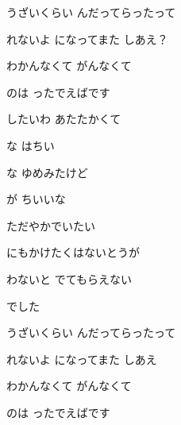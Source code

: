 \documentclass[a4paper,tate,twocolumn,12pt]{ltjtarticle}
\begin{document}
\begin{flushleft}
\noindent\begin{minipage}{\linewidth}
うざいくらい んだってらったって

れないよ になってまた しあえ？

わかんなくて がんなくて

のは ったでえばです
\end{minipage}

\vspace{2em}

\noindent\begin{minipage}{\linewidth}
したいわ あたたかくて

な はちい

な ゆめみたけど

が ちいいな
\end{minipage}

\vspace{2em}

\noindent\begin{minipage}{\linewidth}
ただやかでいたい

にもかけたくはないとうが

わないと でてもらえない

でした
\end{minipage}

\vspace{2em}

\noindent\begin{minipage}{\linewidth}
うざいくらい んだってらったって

れないよ になってまた しあえ

わかんなくて がんなくて

のは ったでえばです
\end{minipage}


\end{flushleft}
\end{document}
